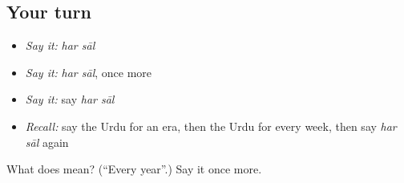 \subsection*{Your turn}
\begin{itemize}
\raggedright
  \item \emph{Say it:} \emph{har sāl}
  \item \emph{Say it:} \emph{har sāl}, once more
  \item \emph{Say it:} say \emph{har sāl}
  \item \emph{Recall:} say the Urdu for an era, then the Urdu for every week, then say \emph{har sāl} again
\end{itemize}

\begin{tcolorbox}[breakable,colback=teal!4,colframe=teal!35!black,title={Before you move on}]
What does   mean? (\textquotedblleft{}Every year\textquotedblright{}.) Say it once more.
\end{tcolorbox}
